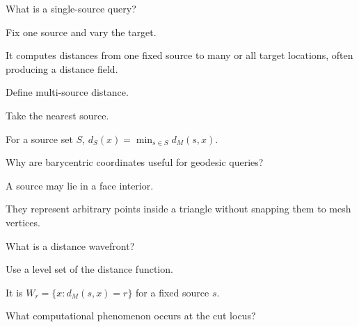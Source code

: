 \begin{exercise}\label{exr:vii38-12}
What is a single-source query?
\end{exercise}

\begin{hint}
Fix one source and vary the target.
\end{hint}

\begin{solution}
It computes distances from one fixed source to many or all target locations, often producing a distance field.
\end{solution}

\begin{exercise}\label{exr:vii38-13}
Define multi-source distance.
\end{exercise}

\begin{hint}
Take the nearest source.
\end{hint}

\begin{solution}
For a source set \(S\), \(d_S(x)=\min_{s\in S}d_M(s,x)\).
\end{solution}

\begin{exercise}\label{exr:vii38-14}
Why are barycentric coordinates useful for geodesic queries?
\end{exercise}

\begin{hint}
A source may lie in a face interior.
\end{hint}

\begin{solution}
They represent arbitrary points inside a triangle without snapping them to mesh vertices.
\end{solution}

\begin{exercise}\label{exr:vii38-15}
What is a distance wavefront?
\end{exercise}

\begin{hint}
Use a level set of the distance function.
\end{hint}

\begin{solution}
It is \(W_r=\{x:d_M(s,x)=r\}\) for a fixed source \(s\).
\end{solution}

\begin{exercise}\label{exr:vii38-16}
What computational phenomenon occurs at the cut locus?
\end{exercise}

